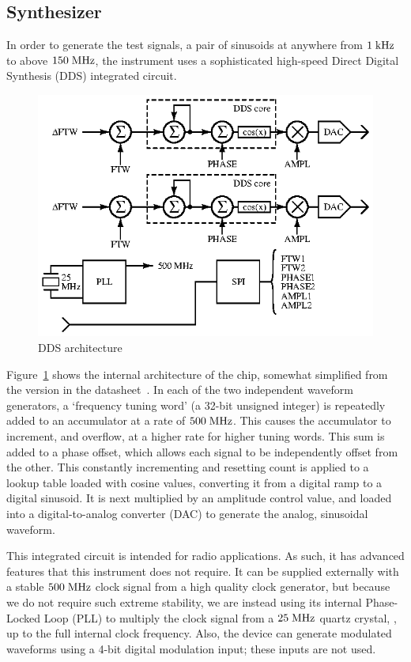 \subsection{Synthesizer}


In order to generate the test signals, a pair of sinusoids at anywhere from
$1\;\mathrm{kHz}$ to above $150\;\mathrm{MHz}$, the instrument uses a sophisticated
high-speed Direct Digital Synthesis (DDS) integrated circuit.

\begin{figure}[H]
\centering
\includegraphics{dds}
\caption{DDS architecture}
\label{fig:dds}
\end{figure}

Figure~\ref{fig:dds} shows the internal architecture of the chip, somewhat
simplified from the version in the datasheet~\cite{ad9958}. In each of the two
independent waveform generators, a `frequency tuning word' (a 32-bit unsigned
integer) is repeatedly added to an accumulator at a rate of $500\;\mathrm{MHz}$.
This causes the accumulator to increment, and overflow, at a higher rate for
higher tuning words. This sum is added to a phase offset, which allows each
signal to be independently offset from the other. This constantly incrementing
and resetting count is applied to a lookup table loaded with cosine values,
converting it from a digital ramp to a digital sinusoid. It is next multiplied
by an amplitude control value, and loaded into a digital-to-analog converter
(DAC) to generate the analog, sinusoidal waveform.

This integrated circuit is intended for radio applications. As such, it has
advanced features that this instrument does not require. It can be supplied
externally with a stable $500\;\mathrm{MHz}$ clock signal from a high quality
clock generator, but because we do not require such extreme stability, we
are instead using its internal Phase-Locked Loop (PLL) to multiply the clock
signal from a $25\;\mathrm{MHz}$ quartz crystal, , up to the full
internal clock frequency. Also, the device can generate modulated waveforms
using a 4-bit digital modulation input; these inputs are not used.


